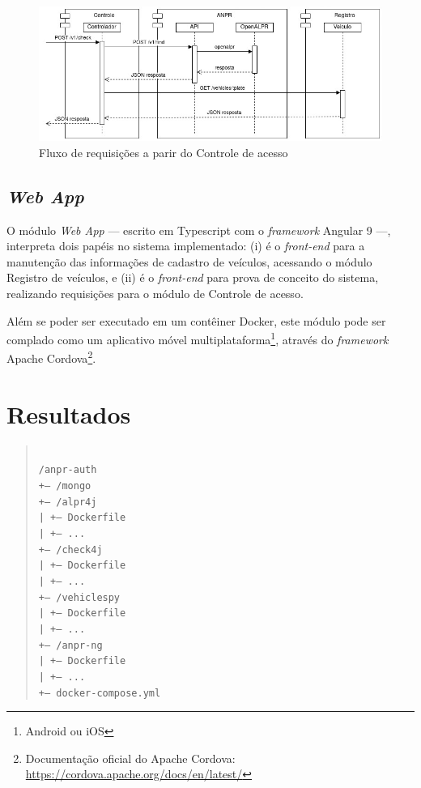 \documentclass[12pt]{article}
\begin{document}
\begin{figure}[ht]
	\centering
	\includegraphics[width=1\textwidth]{check4j.jpg}
	\caption{Fluxo de requisições a parir do Controle de acesso}
	\label{fig:check4j}
\end{figure}

\subsection{\textit{Web App}}

O módulo \textit{Web App} — escrito em Typescript com o \textit{framework} Angular 9 —, interpreta dois papéis no sistema implementado: (i) é o \textit{front-end} para a manutenção das informações de cadastro de veículos, acessando o módulo Registro de veículos, e (ii) é o \textit{front-end} para prova de conceito do sistema, realizando requisições para o módulo de Controle de acesso.

Além se poder ser executado em um contêiner Docker, este módulo pode ser complado como um aplicativo móvel multiplataforma\footnote{Android ou iOS}, através do \textit{framework} Apache Cordova\footnote{Documentação oficial do Apache Cordova: \url{https://cordova.apache.org/docs/en/latest/}}.

\section{Resultados} 

\begin{quotation}
	\texttt{\\
		/anpr-auth\\
		+-- /mongo\\
		+-- /alpr4j\\
		|   +-- Dockerfile\\
		|   +-- ...\\
		+-- /check4j\\
		|   +-- Dockerfile\\
		|   +-- ...\\
		+-- /vehiclespy\\
		|   +-- Dockerfile\\
		|   +-- ...\\
		+-- /anpr-ng\\
		|   +-- Dockerfile\\
		|   +-- ...\\
		+-- docker-compose.yml\\}
\end{quotation}
\end{document}
